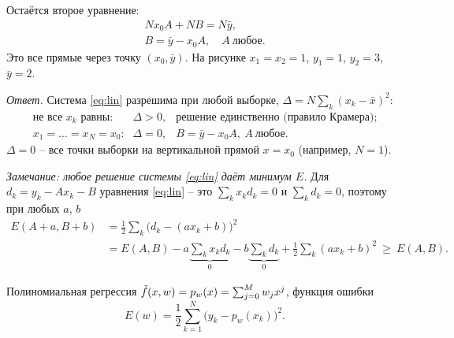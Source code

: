 \documentclass[12pt,a4paper]{article}
\begin{document}
\medskip\noindent
\begin{minipage}{0.53\textwidth}
Остаётся второе уравнение:
\[
  \begin{gathered}
    Nx_0A + NB = N\bar y,\\
    B = \bar y - x_0A, \quad A \ \text{любое}.
  \end{gathered}
\]
Это все прямые через точку $(x_0, \bar y)$. На рисунке $x_1 = x_2 = 1$,
$y_1 = 1$, $y_2 = 3$, $\bar y = 2$.
\end{minipage}\hfill
\begin{minipage}{0.43\textwidth}
\centering
{}
\end{minipage}

\medskip
\emph{Ответ.} Система \eqref{eq:lin} разрешима при любой выборке,
$\Delta = N\sum_k (x_k - \bar x)^2$:
\[
  \begin{array}{lll}
    \text{не все $x_k$ равны:} & \Delta > 0, &
      \text{решение единственно (правило Крамера)};
    \\[1mm]
    x_1 = \dots = x_N = x_0\text{:} & \Delta = 0, & B = \bar y - x_0A,\
      A \ \text{любое}.
  \end{array}
\]
$\Delta = 0$ -- все точки выборки на вертикальной прямой $x = x_0$ (например,
$N = 1$).

\emph{Замечание: любое решение системы \eqref{eq:lin} даёт минимум $E$.} Для
$d_k = y_k - Ax_k - B$ уравнения \eqref{eq:lin} -- это $\sum_k x_kd_k = 0$ и
$\sum_k d_k = 0$, поэтому при любых $a$, $b$
\begin{align*}
  E(A + a, B + b) &= \frac12\sum_k \bigl(d_k - (ax_k + b)\bigr)^2\\
  &= E(A, B) - a\underbrace{\sum_k x_kd_k}_{0} - b\underbrace{\sum_k d_k}_{0}
     + \frac12\sum_k (ax_k + b)^2 \ \ge\ E(A, B) .
\end{align*}

\dano Полиномиальная регрессия $\tilde{f}(x, w) = p_w(x) = \sum_{j=0}^{M} w_j x^j$,
функция ошибки
\[
  E(w) = \frac12\sum_{k=1}^{N}\bigl(y_k - p_w(x_k)\bigr)^2 .
\]
\end{document}
